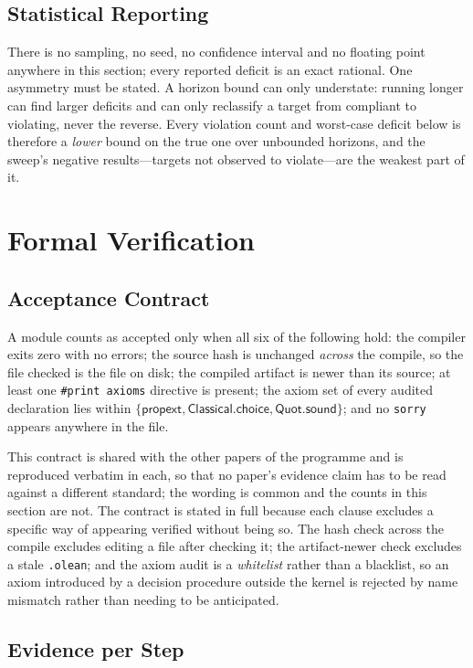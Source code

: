 \subsection{Statistical Reporting}

There is no sampling, no seed, no confidence interval and no floating point anywhere in this
section; every reported deficit is an exact rational. One asymmetry must be stated. A horizon
bound can only understate: running longer can find larger deficits and can only reclassify a
target from compliant to violating, never the reverse. Every violation count and worst-case
deficit below is therefore a \emph{lower} bound on the true one over unbounded horizons, and
the sweep's negative results---targets not observed to violate---are the weakest part of it.

\section{Formal Verification}
\label{sec:verification}

\subsection{Acceptance Contract}

A module counts as accepted only when all six of the following hold: the compiler exits zero
with no errors; the source hash is unchanged \emph{across} the compile, so the file checked is
the file on disk; the compiled artifact is newer than its source; at least one
\texttt{\#print axioms} directive is present; the axiom set of every audited declaration lies
within $\{\textsf{propext},\textsf{Classical.choice},\textsf{Quot.sound}\}$; and no
\texttt{sorry} appears anywhere in the file.

This contract is shared with the other papers of the programme and is reproduced verbatim in
each, so that no paper's evidence claim has to be read against a different standard; the
wording is common and the counts in this section are not. The contract is stated in full
because each clause excludes a specific way of appearing verified without being so. The hash check across the compile excludes editing a file after
checking it; the artifact-newer check excludes a stale \texttt{.olean}; and the axiom audit is
a \emph{whitelist} rather than a blacklist, so an axiom introduced by a decision procedure
outside the kernel is rejected by name mismatch rather than needing to be anticipated.

\subsection{Evidence per Step}


